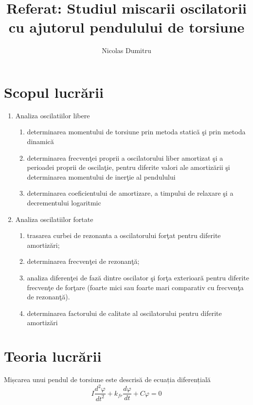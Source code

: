 \documentclass[a4paper]{article}
\title{Referat: Studiul miscarii oscilatorii
cu ajutorul pendulului de torsiune}
\author{Nicolas Dumitru}
\renewcommand{\phi}{\varphi} %
\begin{document}
\maketitle

\section{Scopul lucrării}
\begin{enumerate}
	\item{Analiza oscilatiilor libere}
	      \begin{enumerate}
		      \item determinarea momentului
		            de torsiune prin metoda
		            statică şi prin metoda
		            dinamică
		      \item determinarea frecvenţei
		            proprii a oscilatorului
		            liber amortizat şi a
		            perioadei proprii de
		            oscilaţie, pentru
		            diferite valori ale
		            amortizării şi
		            determinarea momentului
		            de inerţie al pendulului
		      \item determinarea
		            coeficientului de
		            amortizare, a timpului
		            de relaxare şi a
		            decrementului logaritmic

	      \end{enumerate}
	\item{Analiza oscilatiilor fortate}
	      \begin{enumerate}
		      \item trasarea curbei de rezonanta a
		            oscilatorului forţat pentru diferite amortizări;
		      \item determinarea frecvenţei de rezonanţă;
		      \item analiza diferenţei de fază dintre
		            oscilator şi forţa exterioară pentru diferite
		            frecvenţe de forţare (foarte mici sau foarte
		            mari comparativ cu frecvenţa de rezonanţă).
		      \item determinarea factorului de calitate al
		            oscilatorului pentru diferite amortizări
	      \end{enumerate}
\end{enumerate}

\section{Teoria lucrării}
Mișcarea unui pendul de torsiune este descrisă de ecuația diferențială
\begin{equation}
	I \frac{d^2 \phi}{dt^2} + k_{fr} \frac{d \phi}{dt} + C \phi = 0
\end{equation}
\end{document}

